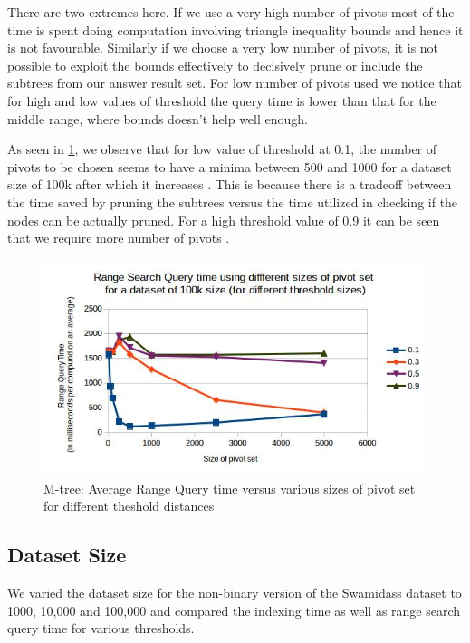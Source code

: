 There are two extremes here. If we use a very high number of pivots most of the time is spent doing computation involving triangle inequality bounds and hence it is not favourable. Similarly if we choose a very low number of pivots, it is not possible to exploit the bounds effectively to decisively prune or include the subtrees from our answer result set. For low number of pivots used we notice that for high and low values of threshold the query time is lower than that for the middle range, where bounds doesn't help well enough.


As seen in \ref{fig:5.7}, we observe that for low value of threshold at 0.1, the number of pivots to be chosen seems to have a minima between 500 and 1000 for a dataset size of 100k after which it increases . This is because there is a tradeoff between the time saved by pruning the subtrees versus the time utilized in checking if the nodes can be actually pruned.  For a high threshold value of 0.9 it can be seen that we require more number of pivots . 

\begin{figure}[ht!]	
\centering
\includegraphics[width=1 \columnwidth]{img/image5.jpg}
\caption{M-tree: Average Range Query time versus various sizes of pivot set for different theshold distances}
\label{fig:5.7}
\end{figure}



\subsection{Dataset Size}
We varied the dataset size for the non-binary version of the Swamidass dataset to 1000, 10,000 and 100,000 and compared the indexing time as well as range search query time for various thresholds. 


